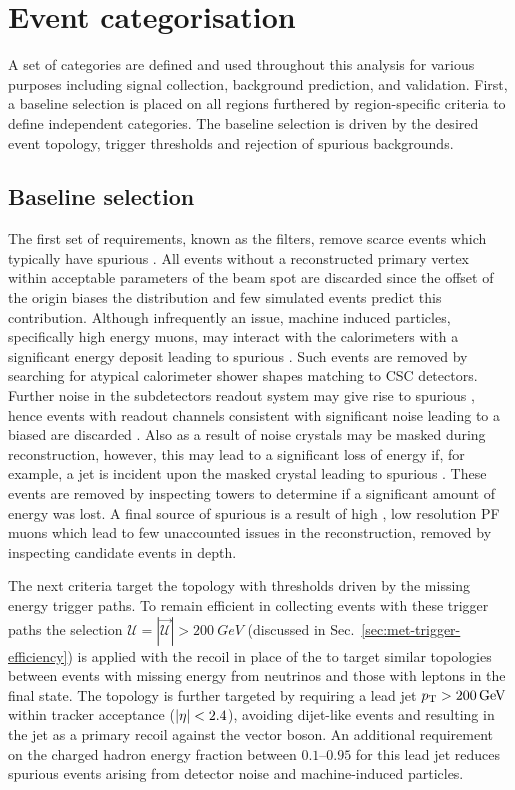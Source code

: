 \section{Event categorisation}

A set of categories are defined and used throughout this analysis for various purposes including signal collection, background prediction, and validation.  First, a baseline selection is placed on all regions furthered by region-specific criteria to define independent categories. The baseline selection is driven by the desired event topology, trigger thresholds and rejection of spurious \ptmiss backgrounds.


\subsection{Baseline selection}\label{sec:baseline-selection}

The first set of requirements, known as the \ptmiss filters, remove scarce events which typically have spurious \ptmiss. All events without a reconstructed primary vertex within acceptable parameters of the beam spot are discarded since the offset of the origin biases the \ptmiss distribution and few simulated events predict this contribution. Although infrequently an issue, machine induced particles, specifically high energy muons, may interact with the calorimeters with a significant energy deposit leading to spurious \ptmiss. Such events are removed by searching for atypical calorimeter shower shapes matching to CSC detectors. Further noise in the \HCAL subdetectors readout system may give rise to spurious \ptmiss, hence events with \HCAL readout channels consistent with significant noise leading to a biased \ptmiss are discarded \cite{CMS-DP-2016-061}. Also as a result of noise \ECAL crystals may be masked during reconstruction, however, this may lead to a significant loss of energy if, for example, a jet is incident upon the masked crystal leading to spurious \ptmiss. These events are removed by inspecting \HWT towers to determine if a significant amount of energy was lost. A final source of spurious \ptmiss is a result of high \pt, low resolution PF muons which lead to few unaccounted issues in the reconstruction, removed by inspecting candidate events in depth.

The next criteria target the \metplusjets topology with thresholds driven by the missing energy trigger paths. To remain efficient in collecting events with these trigger paths the selection ${\mathcal{U}=|\vec{\mathcal{U}}|>\SI{200}{GeV}}$ (discussed in Sec.~\ref{sec:met-trigger-efficiency}) is applied with the recoil in place of the \ptmiss to target similar topologies between events with missing energy from neutrinos and those with leptons in the final state. The topology is further targeted by requiring a lead jet ${p_{\text{T}}>\SI{200}{GeV}}$ within tracker acceptance (${|\eta|<2.4}$), avoiding dijet-like events and resulting in the jet as a primary recoil against the vector boson. An additional requirement on the charged hadron energy fraction between {$0.1$--$0.95$} for this lead jet reduces spurious \ptmiss events arising from detector noise and machine-induced particles.

